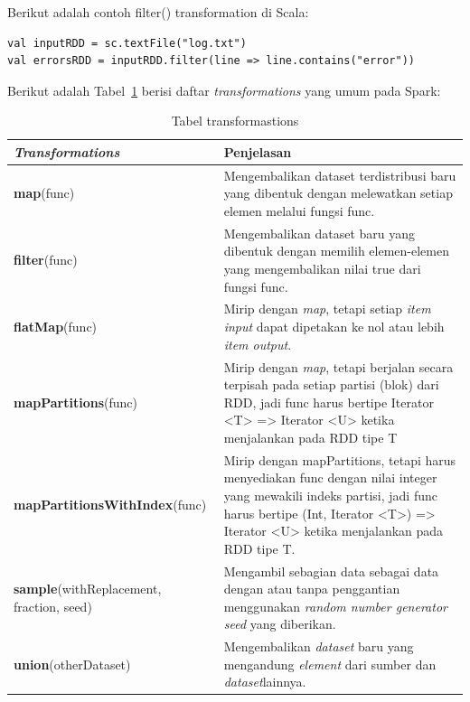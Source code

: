 \documentclass[a4paper,twoside]{article}
\begin{document}
\begin{enumerate}
Berikut adalah contoh filter() transformation di Scala:

\begin{verbatim}
val inputRDD = sc.textFile("log.txt") 
val errorsRDD = inputRDD.filter(line => line.contains("error"))
\end{verbatim}



Berikut adalah Tabel~\ref{tab:trans} berisi daftar \textit{transformations} yang umum pada Spark:

\begin{table}[H] 
	\centering 
	\caption{Tabel transformastions}
	\label{tab:trans}
	\begin{tabular}{ p{6cm}p{9cm}}

\hline
		 \textbf{\textit{Transformations}} & Penjelasan \\
\hline


\hline
\textbf{map}(func) & Mengembalikan dataset terdistribusi baru yang dibentuk dengan melewatkan setiap elemen melalui fungsi func. \\
\hline

\textbf{filter}(func) & Mengembalikan dataset baru yang dibentuk dengan memilih elemen-elemen yang mengembalikan nilai true dari fungsi func. \\
\hline

\textbf{flatMap}(func) & Mirip dengan \textit{map}, tetapi setiap \textit{item input} dapat dipetakan ke nol atau lebih \textit{item output}. \\
\hline
		
\textbf{mapPartitions}(func) & Mirip dengan \textit{map}, tetapi berjalan secara terpisah pada setiap partisi (blok) dari RDD, jadi func harus bertipe Iterator <T> => Iterator <U> ketika menjalankan pada RDD tipe T \\
\hline

\textbf{mapPartitionsWithIndex}(func) & Mirip dengan mapPartitions, tetapi harus menyediakan func dengan nilai integer yang mewakili indeks partisi, jadi func harus bertipe (Int, Iterator <T>) => Iterator <U> ketika menjalankan pada RDD tipe T.\\
\hline

\textbf{sample}(withReplacement, fraction, seed) & 
Mengambil sebagian data sebagai data dengan atau tanpa penggantian menggunakan \textit{random number generator seed} yang diberikan.\\
\hline

\textbf{union}(otherDataset) & Mengembalikan \textit{dataset} baru yang mengandung \textit{element} dari sumber dan \textit{dataset}lainnya.\\


\end{tabular}
\end{table}
\end{enumerate}
\end{document}

